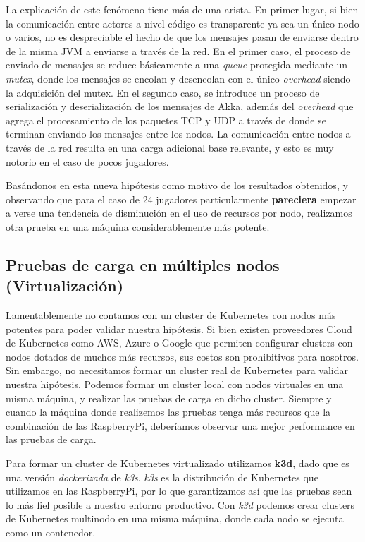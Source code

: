 La explicación de este fenómeno tiene más de una arista. En primer lugar, si bien la comunicación entre actores a nivel código es transparente ya sea un único nodo o varios, no es despreciable
el hecho de que los mensajes pasan de enviarse dentro de la misma JVM a enviarse a través de la red. En el primer caso, el proceso de enviado de mensajes se reduce básicamente a una \textit{queue}
protegida mediante un \textit{mutex}, donde los mensajes se encolan y desencolan con el único \textit{overhead} siendo la adquisición del mutex.
En el segundo caso, se introduce un proceso de serialización y deserialización de los mensajes de Akka, además del \textit{overhead} que agrega el procesamiento de los paquetes
TCP y UDP a través de donde se terminan enviando los mensajes entre los nodos. La comunicación entre nodos a través de la red resulta en una carga adicional base relevante, y esto es muy notorio
en el caso de pocos jugadores.

Basándonos en esta nueva hipótesis como motivo de los resultados obtenidos, y observando que para el caso de 24 jugadores particularmente \textbf{pareciera} empezar a verse una tendencia de disminución
en el uso de recursos por nodo, realizamos otra prueba en una máquina considerablemente más potente.

\subsection{Pruebas de carga en múltiples nodos (Virtualización)}

\noindent Lamentablemente no contamos con un cluster de Kubernetes con nodos más potentes para poder validar nuestra hipótesis. Si bien existen proveedores Cloud de Kubernetes como AWS, Azure o Google que
permiten configurar clusters con nodos dotados de muchos más recursos, sus costos son prohibitivos para nosotros. Sin embargo, no necesitamos formar un cluster real de Kubernetes para validar nuestra hipótesis.
Podemos formar un cluster local con nodos virtuales en una misma máquina, y realizar las pruebas de carga en dicho cluster. Siempre y cuando la máquina donde realizemos las pruebas tenga más recursos que la combinación
de las RaspberryPi, deberíamos observar una mejor performance en las pruebas de carga.

Para formar un cluster de Kubernetes virtualizado utilizamos \textbf{k3d}, dado que es una versión \textit{dockerizada} de \textit{k3s}. \textit{k3s} es la distribución de Kubernetes que utilizamos en las RaspberryPi, por
lo que garantizamos así que las pruebas sean lo más fiel posible a nuestro entorno productivo. Con \textit{k3d} podemos crear clusters de Kubernetes multinodo en una misma máquina, donde cada nodo se ejecuta como un contenedor.


